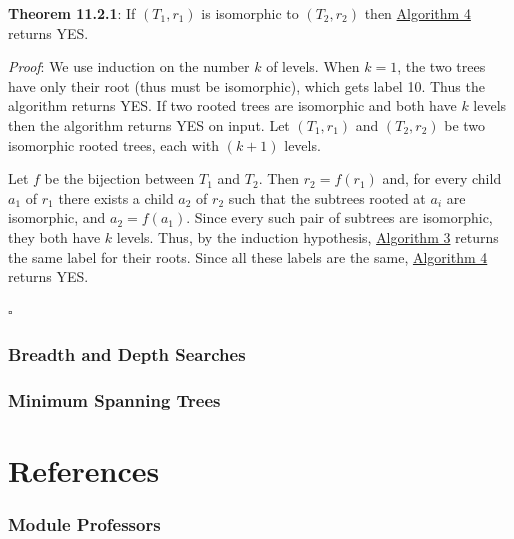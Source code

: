 \documentclass{article}
\newcommand{\separate}[1] {\vspace{#1 pt}\noindent}
\newcommand{\proof}[2]{\textit{Proof}: #2 \begin{flushright}\(\square\)\end{flushright}\label{prf:#1}}
\newcommand{\theorem}[3]{\textbf{Theorem #1}: #2 \par\separate{3}\proof{thm:#1}{#3}\label{thm:#1}}
\begin{document}
\separate{5}\theorem{11.2.1}{If \((T_1,r_1)\) is isomorphic to \((T_2,r_2)\) then \hyperref[alg:Labelled Tree Isomorphism]{Algorithm 4} returns YES.}
{We use induction on the number \(k\) of levels. When \(k=1\), the two trees have only their root (thus must be isomorphic), which gets label 10. Thus the algorithm returns YES. If two rooted trees are isomorphic and both have \(k\) levels then the algorithm returns YES on input. Let \((T_1,r_1)\) and \((T_2,r_2)\) be two isomorphic rooted trees, each with \((k+1)\) levels. 

Let \(f\) be the bijection between \(T_1\) and \(T_2\). Then \(r_2=f(r_1)\) and, for every child \(a_1\) of \(r_1\) there exists a child \(a_2\) of \(r_2\) such that the subtrees rooted at \(a_i\) are isomorphic, and \(a_2 = f(a_1)\). Since every such pair of subtrees are isomorphic, they both have \(k\) levels. Thus, by the induction hypothesis, \hyperref[alg:Label Vertex]{Algorithm 3} returns the same label for their roots. Since all these labels are the same, \hyperref[alg:Labelled Tree Isomorphism]{Algorithm 4} returns YES.}

\section{Breadth and Depth Searches}
\section{Minimum Spanning Trees}

\newpage\part{References}

\section{Module Professors}
\end{document}
